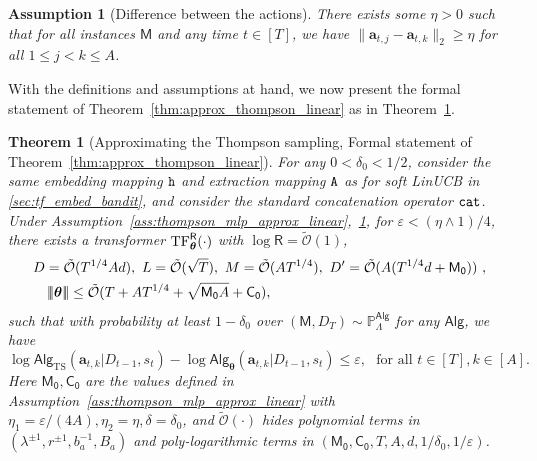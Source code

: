 \documentclass[10pt]{article}
\newtheorem{theorem}{Theorem}
\newtheorem{assumption}{Assumption}
\newcommand{\eps}{\varepsilon}
\newcommand{\<}{\left\langle}
\renewcommand{\>}{\right\rangle}
\newcommand{\TF}{{\rm TF}}
\newcommand{\nrmp}[1]{{\left|\!\left|\!\left|{#1}\right|\!\right|\!\right|}}
\renewcommand{\P}{\mathbb{P}}
\newcommand{\inst}{{\mathsf{M}}}
\newcommand{\TS}{{\mathrm{TS}}}
\newcommand{\Tpsparn}{{r}} %
\newcommand{\trunprob}{{\eta_1}}
\newcommand{\Trunregpa}{{\eta_2}}  %
\newcommand{\Trunregp}{{\eta}}
\newcommand{\tcO}{{\tilde{\mathcal O}}}
\newcommand{\state}{{s}}
\newcommand{\totlen}{{T}} %
\newcommand{\cat}{{\tt cat}}
\newcommand{\extractmap}{{\tt A}}
\newcommand{\embedmap}{{\tt h}}
\newcommand{\sAlg}{{\mathsf{Alg}}}
\newcommand{\dset}{{D}}
\newcommand{\prior}{{\Lambda}}
\newcommand{\tfpar}{{\btheta}}
\newcommand{\hidden}{{D'}}
\newcommand{\clipval}{{\mathsf{R}}}
\newcommand{\neuron}{{\mathsf{M_0}}}
\newcommand{\weightn}{{{\mathsf{C_0}}}}
\def\btheta{{\boldsymbol \theta}}
\def\ba{{\mathbf a}}
\newcommand{\authnote}[2]{{\scriptsize $\ll$\textsf{#1 notes: #2}$\gg$}}
\newcommand{\authnote}[2]{}
\newcommand{\lc}[1]{{\color{blue}\authnote{Licong}{#1}}}
\begin{document}
\begin{assumption}[Difference between the actions]\label{ass:thompson_mlp_diff_action_linear}
 There exists some $\Trunregp>0$  such that for all instances $\inst$ and any time $t\in[T]$, we have $\|\ba_{t,j}-\ba_{t,k}\|_2\geq\Trunregp$ for all $1\leq j< k\leq A$.
\end{assumption}

With the definitions and assumptions at hand, we now present the formal statement of Theorem~\ref{thm:approx_thompson_linear} as in Theorem~\ref{thm:approx_thompson_linear-formal}.



\begin{theorem}[Approximating the Thompson sampling, Formal statement of Theorem~\ref{thm:approx_thompson_linear}]\label{thm:approx_thompson_linear-formal}
For any $0<\delta_0<1/2$, consider the same embedding mapping $\embedmap$ and extraction mapping $\extractmap$ as for soft LinUCB in \ref{sec:tf_embed_bandit},
and consider the standard concatenation operator $\cat$. Under Assumption~\ref{ass:thompson_mlp_approx_linear},~\ref{ass:thompson_mlp_diff_action_linear}, for $\eps<(\Trunregp\wedge1)/4$, there exists a  transformer $\TF_\btheta^{\clipval}(\cdot)$ with $\log \clipval = \tcO(1)$, 
\begin{align}
&D=\tcO(T^{1/4}Ad),~L= \tcO(\sqrt{T}),~ M =\tcO(AT^{1/4}),~\hidden=\tcO(A(T^{1/4}d+\neuron))~,\notag\\
&~~~\nrmp{\btheta}\leq \tcO(T+AT^{1/4}+\sqrt{ \neuron A}+\weightn),\label{eq:ts_tf_param-formal}
\end{align} 
such that with probability at least $1-\delta_0$ over $(\inst, \dset_{\totlen}) \sim \P_{\prior}^{\sAlg}$ for any $\sAlg$, we have
\[
\log \sAlg_{\TS}(\ba_{t,k}|\dset_{t-1},\state_t) - \log \sAlg_{\tfpar}(\ba_{t,k}|\dset_{t-1},\state_t) \leq \eps, ~~~ \text{for all } t\in[T],k\in[A].
\]
Here  $\neuron,\weightn$ are the values defined in   Assumption~\ref{ass:thompson_mlp_approx_linear} with $\trunprob=\eps/(4A),\Trunregpa=\Trunregp,\delta=\delta_0$, and $\tcO(\cdot)$ hides polynomial terms in $(\lambda^{\pm1},\Tpsparn^{\pm1},b_a^{-1},B_a)$ and poly-logarithmic terms in $(\neuron,\weightn,\totlen,A,d,1/\delta_0,1/\eps)$.
\end{theorem}
\end{document}
